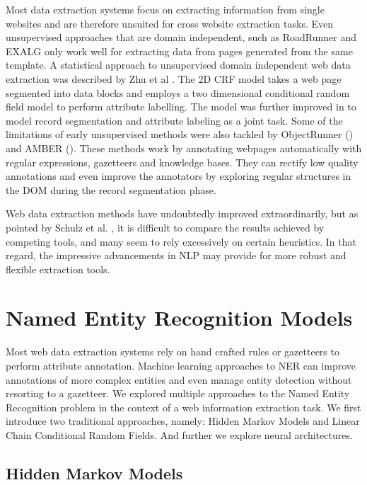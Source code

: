 \documentclass[sigconf]{acmart}
\begin{document}
Most data extraction systems focus on extracting information from single websites
and are therefore unsuited for cross website extraction tasks. Even unsupervised
approaches that are domain independent, such as RoadRunner \cite{Crescenzi2001} 
and EXALG \cite{Arasu2003} only work well for extracting data from pages generated 
from the same template. A statistical approach to unsupervised domain 
independent web data extraction was described by Zhu et al \cite{Zhu2005}. The 2D CRF 
model takes a web page segmented into data blocks and employs a two dimensional conditional 
random field model to perform attribute labelling. The model was further improved in 
\cite{Zhu2006} to model record segmentation and attribute labeling as a joint task.
Some of the limitations of early unsupervised methods 
were also tackled by ObjectRunner (\cite{Abdessalem2010}) and AMBER (\cite{Furche2012}). 
These methods work by annotating webpages automatically with regular expressions, gazetteers and 
knowledge bases. They can rectify low quality annotations and even improve the annotators
by exploring regular structures in the DOM during the record segmentation phase.

Web data extraction methods have undoubtedly improved extraordinarily, but
as pointed by Schulz et al. \cite{Schulz2016}, it is difficult to compare the results 
achieved by competing tools, and many seem to rely excessively on certain heuristics.
In that regard, the impressive advancements in NLP may provide for more robust and
flexible extraction tools.

\section{Named Entity Recognition Models}

Most web data extraction systems rely on hand crafted rules or gazetteers to perform
attribute annotation. Machine learning approaches to NER can improve annotations of 
more complex entities and even manage entity detection without resorting to a gazetteer.
We explored multiple approaches to the Named Entity Recognition problem in the context 
of a web information extraction task. We first introduce two traditional approaches, 
namely: Hidden Markov Models and Linear Chain Conditional Random Fields. And further
we explore neural architectures.

\subsection{Hidden Markov Models}
\end{document}
